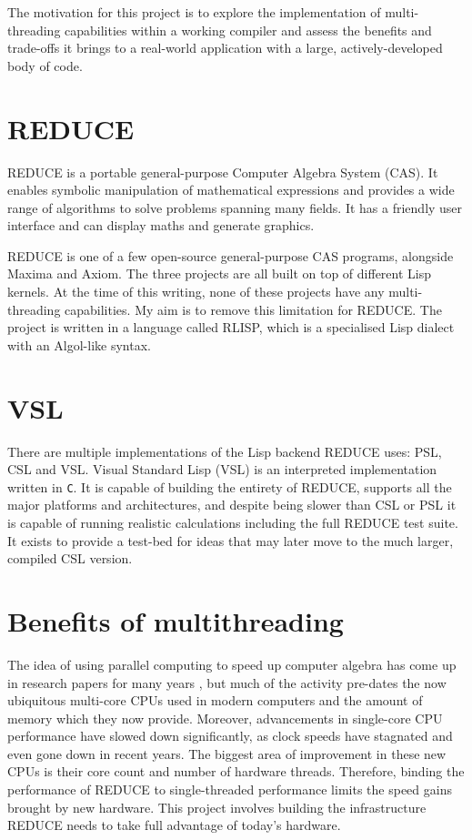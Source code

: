 The motivation for this project is to explore the implementation of multi-threading
capabilities within a working compiler and assess the benefits and trade-offs it brings
to a real-world application with a large, actively-developed body of code.

\section{REDUCE}

REDUCE \cite{reduce} is a portable general-purpose Computer Algebra System (CAS). It enables symbolic
manipulation of mathematical expressions and provides a wide range of algorithms
to solve problems spanning many fields.
It has a friendly user interface and can display maths and generate graphics.

REDUCE is one of a few open-source general-purpose CAS programs, alongside Maxima and Axiom.
The three projects are all built on top of different Lisp kernels. At the time of this writing,
none of these projects have any multi-threading capabilities. My aim is to remove this limitation
for REDUCE. The project is written in a language called RLISP, which is a specialised
Lisp dialect with an Algol-like syntax.

\section{VSL}

There are multiple implementations of the Lisp backend REDUCE uses: PSL, CSL and VSL.
Visual Standard Lisp (VSL) is an interpreted implementation written
in \texttt{C}. It is capable of building the entirety of REDUCE, supports all the major
platforms and architectures, and despite being slower than CSL or PSL it is capable of
running realistic calculations including the full REDUCE test suite.
It exists to provide a test-bed for ideas that may later move to the much larger,
compiled CSL version.

\section{Benefits of multithreading}
The idea of using parallel computing to speed up computer algebra has come
up in research papers for many years \cite{algebra-parallelism},
but much of the activity
pre-dates the now ubiquitous multi-core CPUs used in modern computers and the amount of memory
which they now provide. Moreover, advancements in single-core CPU performance have slowed down
significantly, as clock speeds have stagnated and even gone down in recent years. The biggest
area of improvement in these new CPUs is their core count and number of hardware threads.
Therefore, binding the performance of REDUCE to single-threaded performance limits the speed gains
brought by new hardware. This project involves building the infrastructure
REDUCE needs to take full advantage of today's hardware.

